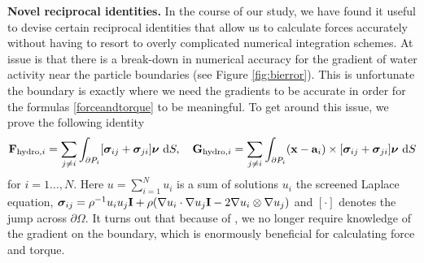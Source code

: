 \textbf{Novel reciprocal identities.}
In the course of our study, we have found it useful to devise certain reciprocal identities that
allow us to calculate forces accurately without having to resort to overly complicated numerical integration schemes. 
At issue is that there is a break-down in numerical accuracy for the gradient of water activity near the particle
boundaries (see Figure \ref{fig:bierror}).
This is unfortunate the boundary is exactly where we need the gradients to be accurate in order for the formulas \eqref{forceandtorque}
to be meaningful. To get around this issue, we prove the following identity
  \begin{equation}
    \label{eq:reciprocal}
{\bf F}_{\text{hydro},i} = \sum_{j \neq i} \int_{\partial P_i}[\boldsymbol{\sigma}_{ij} + \boldsymbol{\sigma}_{ji}]\boldsymbol{\nu}\,\dif S,\quad
{\bf G}_{\text{hydro},i} = \sum_{j \neq i} \int_{\partial P_i} ({\bf x}-\mathbf{a}_i) \times [\boldsymbol{\sigma}_{ij} + \boldsymbol{\sigma}_{ji}]\boldsymbol{\nu}\,\dif S
  \end{equation}
for $i = 1\dots, N$. Here $u = \sum_{i=1}^N u_i$ is a sum of solutions $u_i$ the screened Laplace equation,
$\boldsymbol{\sigma}_{ij} = \rho^{-1} u_iu_j {\bf I} + \rho(\nabla u_i \cdot \nabla u_j {\bf I} - 2 \nabla u_i \otimes \nabla u_j)$ and
$[\cdot]$ denotes the jump across $\partial \Omega.$  It turns out that because of \cite{eq:reciprocal},
we no longer require knowledge of the gradient on the boundary, which is enormously beneficial for calculating force and torque.




